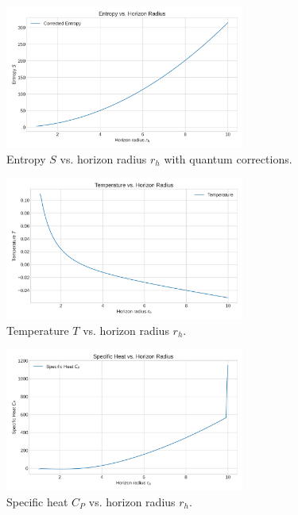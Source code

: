 \documentclass[12pt]{article}
\begin{document}
\begin{figure}[h!]
    \centering
    \includegraphics[width=0.7\textwidth]{figures/entropy_vs_rh.png}
    \caption{Entropy $S$ vs. horizon radius $r_h$ with quantum corrections.}
\end{figure}

\begin{figure}[h!]
    \centering
    \includegraphics[width=0.7\textwidth]{figures/temperature_vs_rh.png}
    \caption{Temperature $T$ vs. horizon radius $r_h$.}
\end{figure}

\begin{figure}[h!]
    \centering
    \includegraphics[width=0.7\textwidth]{figures/specific_heat_vs_rh.png}
    \caption{Specific heat $C_P$ vs. horizon radius $r_h$.}
\end{figure}
\end{document}
